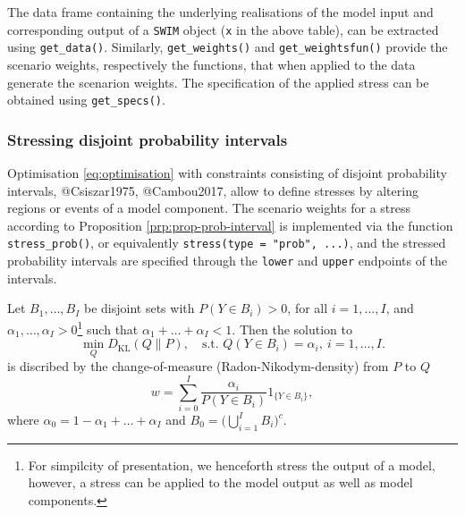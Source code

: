 \documentclass[]{article}
\let\rmarkdownfootnote\footnote%
\def\footnote{\protect\rmarkdownfootnote}
\theoremstyle{definition}
\theoremstyle{definition}
\theoremstyle{definition}
\theoremstyle{remark}
\let\BeginKnitrBlock\begin \let\EndKnitrBlock\end
\begin{document}
The data frame containing the underlying realisations of the model input and corresponding output of a \texttt{SWIM} object (\texttt{x} in the above table), can be extracted using \texttt{get\_data()}. Similarly, \texttt{get\_weights()} and \texttt{get\_weightsfun()} provide the scenario weights, respectively the functions, that when applied to the data generate the scenarion weights. The specification of the applied stress can be obtained using \texttt{get\_specs()}.

\hypertarget{stressing-disjoint-probability-intervals}{%
\subsubsection{Stressing disjoint probability intervals}\label{stressing-disjoint-probability-intervals}}

Optimisation \eqref{eq:optimisation} with constraints consisting of disjoint probability intervals, @Csiszar1975, @Cambou2017, allow to define stresses by altering regions or events of a model component. The scenario weights for a stress according to Proposition \ref{prp:prop-prob-interval} is implemented via the function \texttt{stress\_prob()}, or equivalently \texttt{stress(type\ =\ "prob",\ ...)}, and the stressed probability intervals are specified through the \texttt{lower} and \texttt{upper} endpoints of the intervals.

\BeginKnitrBlock{proposition}[see Proposition 3.1 in @Pesenti2019]
\protect\hypertarget{prp:prop-prob-interval}{}{\label{prp:prop-prob-interval} \iffalse (see Proposition 3.1 in @Pesenti2019) \fi{} }
Let \(B_1, \ldots, B_I\) be disjoint sets with \(P(Y \in B_i) >0\), for all \(i = 1, \ldots, I\), and \(\alpha_1, \ldots, \alpha_I > 0\)\footnote{For simpilcity of presentation, we henceforth stress the output of a model, however, a stress can be applied to the model output as well as model components.} such that \(\alpha_1 + \ldots + \alpha_I < 1\). Then the solution to
\begin{equation} 
\min_{Q} D_\text{KL}(Q \| P), \quad
\text{s.t. } Q(Y \in B_i) = \alpha_i, ~i = 1, \ldots, I.
\end{equation}
is discribed by the change-of-measure (Radon-Nikodym-density) from \(P\) to \(Q\)
\begin{equation} 
w  = \sum_{i = 0}^I \frac{\alpha_i}{P(Y \in B_i)}1_{ \{Y \in B_i
\}},
\end{equation}
where \(\alpha_0 = 1 - \alpha_1 + \ldots + \alpha_I\) and \(B_0 = \Big( \bigcup_{i = 1}^I B_i \Big)^c\).
\EndKnitrBlock{proposition}
\end{document}
